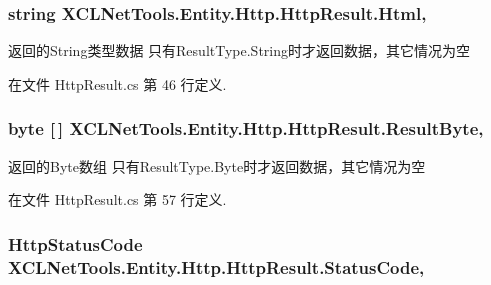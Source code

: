 \subsubsection[{\texorpdfstring{Html}{Html}}]{\setlength{\rightskip}{0pt plus 5cm}string X\+C\+L\+Net\+Tools.\+Entity.\+Http.\+Http\+Result.\+Html\hspace{0.3cm}{\ttfamily [get]}, {\ttfamily [set]}}\hypertarget{class_x_c_l_net_tools_1_1_entity_1_1_http_1_1_http_result_a9fc43bbbeb2f24faeeab16785cd7c402}{}\label{class_x_c_l_net_tools_1_1_entity_1_1_http_1_1_http_result_a9fc43bbbeb2f24faeeab16785cd7c402}


返回的\+String类型数据 只有\+Result\+Type.\+String时才返回数据，其它情况为空 



在文件 Http\+Result.\+cs 第 46 行定义.

\subsubsection[{\texorpdfstring{Result\+Byte}{ResultByte}}]{\setlength{\rightskip}{0pt plus 5cm}byte \mbox{[}$\,$\mbox{]} X\+C\+L\+Net\+Tools.\+Entity.\+Http.\+Http\+Result.\+Result\+Byte\hspace{0.3cm}{\ttfamily [get]}, {\ttfamily [set]}}\hypertarget{class_x_c_l_net_tools_1_1_entity_1_1_http_1_1_http_result_aced655e4fc880e3123a3eb5c899a0085}{}\label{class_x_c_l_net_tools_1_1_entity_1_1_http_1_1_http_result_aced655e4fc880e3123a3eb5c899a0085}


返回的\+Byte数组 只有\+Result\+Type.\+Byte时才返回数据，其它情况为空 



在文件 Http\+Result.\+cs 第 57 行定义.

\subsubsection[{\texorpdfstring{Status\+Code}{StatusCode}}]{\setlength{\rightskip}{0pt plus 5cm}Http\+Status\+Code X\+C\+L\+Net\+Tools.\+Entity.\+Http.\+Http\+Result.\+Status\+Code\hspace{0.3cm}{\ttfamily [get]}, {\ttfamily [set]}}\hypertarget{class_x_c_l_net_tools_1_1_entity_1_1_http_1_1_http_result_afa7d6f65074d0dc74bca65f6e7d79a79}{}\label{class_x_c_l_net_tools_1_1_entity_1_1_http_1_1_http_result_afa7d6f65074d0dc74bca65f6e7d79a79}


